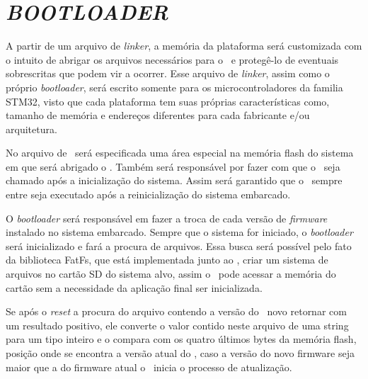 


\section{\textit{BOOTLOADER}}
\label{sec:Bootloader}

A partir de um arquivo de \textit{linker}, a memória da plataforma será customizada com o intuito de abrigar os arquivos necessários para o \bootloader\ e protegê-lo de eventuais sobrescritas que podem vir a ocorrer. Esse arquivo de \textit{linker}, assim como o próprio \textit{bootloader}, será escrito somente para os microcontroladores da familia STM32, visto que cada plataforma tem suas próprias características como, tamanho de memória e endereços diferentes para cada fabricante e/ou arquitetura.

No arquivo de \linker\ será especificada uma área especial na memória flash do sistema em que será abrigado o \bootloader. Também será responsável por fazer com que o \bootloader\ seja chamado após a inicialização do sistema. Assim será garantido que o \bootloader\ sempre entre seja executado após a reinicialização do sistema embarcado.


O \textit{bootloader} será responsável em fazer a troca de cada versão de \textit{firmware} instalado no sistema embarcado. Sempre que o sistema for iniciado, o \textit{bootloader} será inicializado e fará a procura de arquivos. Essa busca será possível pelo fato da biblioteca FatFs, que está implementada junto ao \bootloader, criar um sistema de arquivos no cartão SD do sistema alvo, assim o \bootloader\ pode acessar a memória do cartão sem a necessidade da aplicação final ser inicializada.

Se após o \textit{reset} a procura do arquivo contendo a versão do \firmware\ novo retornar com um resultado positivo, ele converte o valor contido neste arquivo de uma string para um tipo inteiro e o compara com os quatro últimos bytes da memória flash, posição onde se encontra a versão atual do \firmware , caso a versão do novo firmware seja maior que a do firmware atual o \bootloader\ inicia o processo de atualização.

